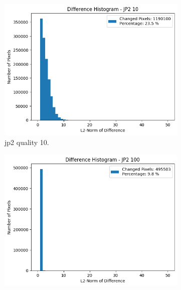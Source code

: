 \begin{figure}[htb]
\begin{subfigure}[b]{0.49\textwidth}
            \label{fig:img_quality_histogram_5}
        \end{subfigure}
        \\
        \begin{subfigure}[b]{0.49\textwidth}
            \centering
            \includegraphics[width=\textwidth]{doc/thesis/0_figures/compare_quality/set1/jp2_10_diff_histogram.png}
            \caption{\gls{jp2} quality 10.}
            \label{fig:img_quality_histogram_10}
        \end{subfigure}
        \begin{subfigure}[b]{0.49\textwidth}
            \centering
            \includegraphics[width=\textwidth]{doc/thesis/0_figures/compare_quality/set1/jp2_100_diff_histogram.png}

\end{subfigure}
\end{figure}

